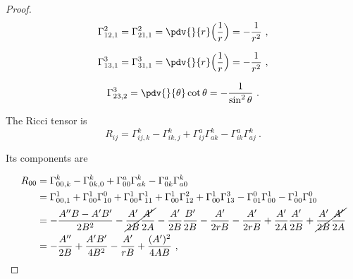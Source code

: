 \begin{proof}
        \begin{equation*}
            \Gamma^2_{12,1} = \Gamma^2_{21,1} = \pdv{}{r} \Big ( \frac{1}{r}\Big)  = - \frac{1}{r^2} ~,
        \end{equation*}

        \begin{equation*}
            \Gamma^3_{13,1} = \Gamma^3_{31,1} = \pdv{}{r} \Big ( \frac{1}{r} \Big) = - \frac{1}{r^2} ~,
        \end{equation*}

        \begin{equation*}
            \Gamma^3_{23,2} = \pdv{}{\theta} \cot \theta = - \frac{1}{\sin^2 \theta} ~.
        \end{equation*}

        The Ricci tensor is 
        \begin{equation*}
            R_{ij} = \Gamma^k_{ij,k} - \Gamma^k_{ik,j} + \Gamma^a_{ij} \Gamma^k_{ak} - \Gamma^a_{ik} \Gamma^k_{aj} ~.
        \end{equation*}

        Its components are

        \begin{equation*}
        \begin{aligned}
            R_{00} & = \Gamma^k_{00,k} - \Gamma^k_{0k,0} + \Gamma^a_{00} \Gamma^k_{ak} - \Gamma^a_{0k} \Gamma^k_{a0} \\ & =  \Gamma^1_{00,1} + \Gamma^1_{00} \Gamma^0_{10} + \Gamma^1_{00} \Gamma^1_{11} + \Gamma^1_{00} \Gamma^2_{12} + \Gamma^1_{00} \Gamma^3_{13} - \Gamma^0_{01} \Gamma^1_{00} - \Gamma^1_{00} \Gamma^0_{10} \\ & = - \frac{A''B - A' B'}{2B^2} - \cancel{\frac{A'}{2B} \frac{A'}{2A}} - \frac{A'}{2B} \frac{B'}{2B} - \frac{A'}{2rB} - \frac{A'}{2rB} + \frac{A'}{2A} \frac{A'}{2B} + \cancel{\frac{A'}{2B} \frac{A'}{2A}} \\ & = - \frac{A''}{2B} + \frac{A'B'}{4B^2} - \frac{A'}{rB} + \frac{(A')^2}{4 AB} ~,
        \end{aligned}
        \end{equation*}


\end{proof}
